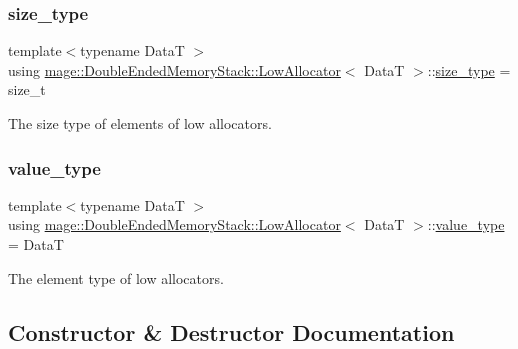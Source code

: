 \subsubsection{\texorpdfstring{size\+\_\+type}{size\_type}}
{\footnotesize\ttfamily template$<$typename DataT $>$ \\
using \hyperlink{structmage_1_1_double_ended_memory_stack_1_1_low_allocator}{mage\+::\+Double\+Ended\+Memory\+Stack\+::\+Low\+Allocator}$<$ DataT $>$\+::\hyperlink{structmage_1_1_double_ended_memory_stack_1_1_low_allocator_ad59f0cf4da8f47289493179d9236e342}{size\+\_\+type} =  size\+\_\+t}

The size type of elements of low allocators. \hypertarget{structmage_1_1_double_ended_memory_stack_1_1_low_allocator_a76b57f9b67a84b4e09def8ce54451acb}{}\label{structmage_1_1_double_ended_memory_stack_1_1_low_allocator_a76b57f9b67a84b4e09def8ce54451acb} 
\subsubsection{\texorpdfstring{value\+\_\+type}{value\_type}}
{\footnotesize\ttfamily template$<$typename DataT $>$ \\
using \hyperlink{structmage_1_1_double_ended_memory_stack_1_1_low_allocator}{mage\+::\+Double\+Ended\+Memory\+Stack\+::\+Low\+Allocator}$<$ DataT $>$\+::\hyperlink{structmage_1_1_double_ended_memory_stack_1_1_low_allocator_a76b57f9b67a84b4e09def8ce54451acb}{value\+\_\+type} =  DataT}

The element type of low allocators. 

\subsection{Constructor \& Destructor Documentation}
\hypertarget{structmage_1_1_double_ended_memory_stack_1_1_low_allocator_ad2de0c8d250130d5bd9c730f4ff5726c}{}\label{structmage_1_1_double_ended_memory_stack_1_1_low_allocator_ad2de0c8d250130d5bd9c730f4ff5726c} 

